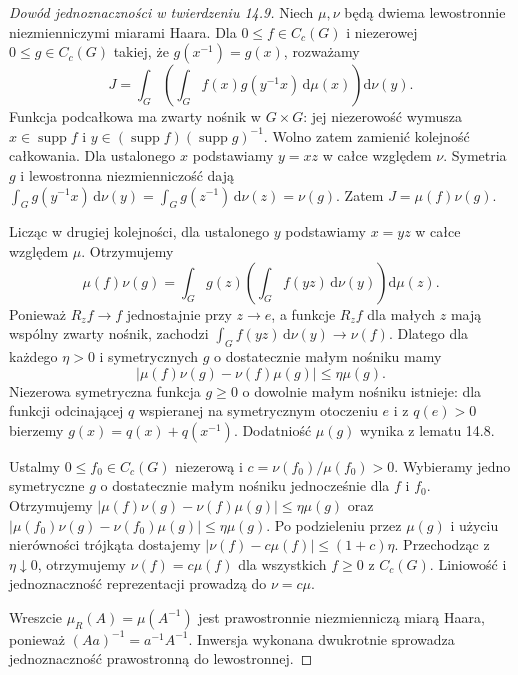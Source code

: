 \documentclass[11pt,a4paper]{article}
\numberwithin{equation}{section}
\theoremstyle{plain}
\theoremstyle{definition}
\theoremstyle{remark}
\newcommand{\supp}{\operatorname{supp}}
\begin{document}
\begin{proof}[Dowód jednoznaczności w twierdzeniu 14.9]
Niech $\mu,\nu$ będą dwiema lewostronnie niezmienniczymi miarami Haara. Dla $0\le f\in C_c(G)$ i niezerowej $0\le g\in C_c(G)$ takiej, że $g(x^{-1})=g(x)$, rozważamy
\[
J=\int_G\left(\int_G f(x)g(y^{-1}x)\,\mathrm d\mu(x)\right)\mathrm d\nu(y).
\]
Funkcja podcałkowa ma zwarty nośnik w $G\times G$: jej niezerowość wymusza $x\in\supp f$ i $y\in(\supp f)(\supp g)^{-1}$. Wolno zatem zamienić kolejność całkowania. Dla ustalonego $x$ podstawiamy $y=xz$ w całce względem $\nu$. Symetria $g$ i lewostronna niezmienniczość dają
$\int_G g(y^{-1}x)\,\mathrm d\nu(y)=\int_Gg(z^{-1})\,\mathrm d\nu(z)=\nu(g)$.
Zatem $J=\mu(f)\nu(g)$.

Licząc w drugiej kolejności, dla ustalonego $y$ podstawiamy $x=yz$ w całce względem $\mu$. Otrzymujemy
\[
\mu(f)\nu(g)=\int_Gg(z)\left(\int_Gf(yz)\,\mathrm d\nu(y)\right)\mathrm d\mu(z).
\]
Ponieważ $R_zf\to f$ jednostajnie przy $z\to e$, a funkcje $R_zf$ dla małych $z$ mają wspólny zwarty nośnik, zachodzi $\int_Gf(yz)\,\mathrm d\nu(y)\to\nu(f)$. Dlatego dla każdego $\eta>0$ i symetrycznych $g$ o dostatecznie małym nośniku mamy
\[
|\mu(f)\nu(g)-\nu(f)\mu(g)|\le\eta\mu(g).
\]
Niezerowa symetryczna funkcja $g\ge0$ o dowolnie małym nośniku istnieje: dla funkcji odcinającej $q$ wspieranej na symetrycznym otoczeniu $e$ i z $q(e)>0$ bierzemy $g(x)=q(x)+q(x^{-1})$. Dodatniość $\mu(g)$ wynika z lematu 14.8.

Ustalmy $0\le f_0\in C_c(G)$ niezerową i $c=\nu(f_0)/\mu(f_0)>0$. Wybieramy jedno symetryczne $g$ o dostatecznie małym nośniku jednocześnie dla $f$ i $f_0$. Otrzymujemy
$|\mu(f)\nu(g)-\nu(f)\mu(g)|\le\eta\mu(g)$ oraz
$|\mu(f_0)\nu(g)-\nu(f_0)\mu(g)|\le\eta\mu(g)$.
Po podzieleniu przez $\mu(g)$ i użyciu nierówności trójkąta dostajemy $|\nu(f)-c\mu(f)|\le(1+c)\eta$. Przechodząc z $\eta\downarrow0$, otrzymujemy $\nu(f)=c\mu(f)$ dla wszystkich $f\ge0$ z $C_c(G)$. Liniowość i jednoznaczność reprezentacji prowadzą do $\nu=c\mu$.

Wreszcie $\mu_R(A)=\mu(A^{-1})$ jest prawostronnie niezmienniczą miarą Haara, ponieważ $(Aa)^{-1}=a^{-1}A^{-1}$. Inwersja wykonana dwukrotnie sprowadza jednoznaczność prawostronną do lewostronnej.
\end{proof}
\end{document}
